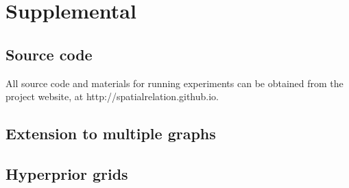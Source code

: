 \documentclass{article}
\begin{document}
\section{Supplemental}
\subsection{Source code}

All source code and materials for running experiments can be
obtained from the project website, at http://spatialrelation.github.io. 

\subsection{Extension to multiple graphs}

\subsection{Hyperprior grids}


\printbibliography
\end{document}
